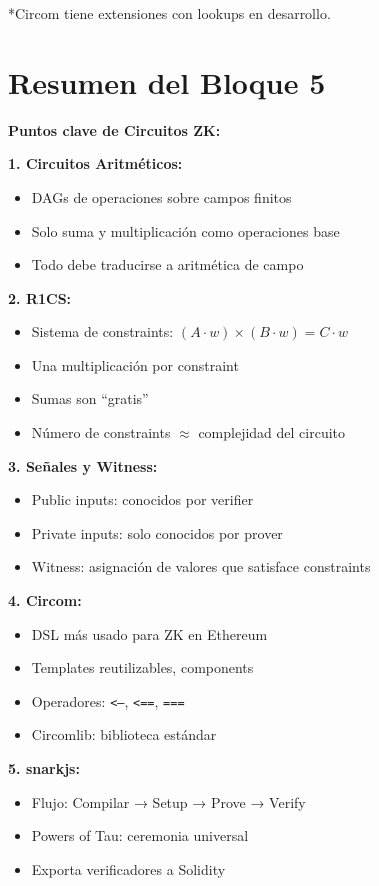 \documentclass[11pt,a4paper,twoside,openright]{book}
\theoremstyle{definition}
\theoremstyle{plain}
\theoremstyle{remark}
\begin{document}
*Circom tiene extensiones con lookups en desarrollo.

\section{Resumen del Bloque 5}

\begin{keyidea}
\textbf{Puntos clave de Circuitos ZK:}

\textbf{1. Circuitos Aritméticos:}
\begin{itemize}
    \item DAGs de operaciones sobre campos finitos
    \item Solo suma y multiplicación como operaciones base
    \item Todo debe traducirse a aritmética de campo
\end{itemize}

\textbf{2. R1CS:}
\begin{itemize}
    \item Sistema de constraints: $(A \cdot w) \times (B \cdot w) = C \cdot w$
    \item Una multiplicación por constraint
    \item Sumas son ``gratis''
    \item Número de constraints $\approx$ complejidad del circuito
\end{itemize}

\textbf{3. Señales y Witness:}
\begin{itemize}
    \item Public inputs: conocidos por verifier
    \item Private inputs: solo conocidos por prover
    \item Witness: asignación de valores que satisface constraints
\end{itemize}

\textbf{4. Circom:}
\begin{itemize}
    \item DSL más usado para ZK en Ethereum
    \item Templates reutilizables, components
    \item Operadores: \texttt{<--}, \texttt{<==}, \texttt{===}
    \item Circomlib: biblioteca estándar
\end{itemize}

\textbf{5. snarkjs:}
\begin{itemize}
    \item Flujo: Compilar → Setup → Prove → Verify
    \item Powers of Tau: ceremonia universal
    \item Exporta verificadores a Solidity
\end{itemize}


\end{keyidea}
\end{document}
